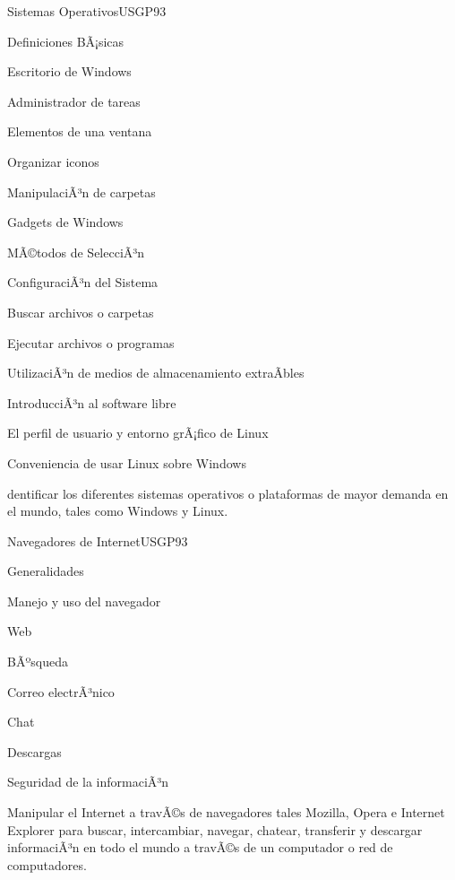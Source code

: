 \begin{syllabus}
\begin{unit}{Sistemas Operativos}{USGP}{9}{3}
\begin{topics}
      \item Definiciones BÃ¡sicas
      \item Escritorio de Windows
      \item Administrador de tareas
      \item Elementos de una ventana
      \item Organizar iconos
      \item ManipulaciÃ³n de carpetas
      \item Gadgets de Windows 
      \item MÃ©todos de SelecciÃ³n
      \item ConfiguraciÃ³n del Sistema
      \item Buscar archivos o carpetas
      \item Ejecutar archivos o programas
      \item UtilizaciÃ³n de medios de almacenamiento extraÃ­bles
      \item IntroducciÃ³n al software libre
      \item El perfil de usuario y entorno grÃ¡fico de Linux
      \item Conveniencia de usar Linux sobre Windows
\end{topics}
\begin{unitgoals}
   \item dentificar los diferentes sistemas operativos o plataformas de mayor demanda en el mundo, tales como Windows y Linux.
\end{unitgoals}
\end{unit}

\begin{unit}{Navegadores de Internet}{USGP}{9}{3}
\begin{topics}
      \item Generalidades
      \item Manejo y uso del navegador
      \item Web
      \item BÃºsqueda
      \item Correo electrÃ³nico
      \item Chat
      \item Descargas
      \item Seguridad de la informaciÃ³n
\end{topics}
\begin{unitgoals}
   \item Manipular el Internet a travÃ©s de navegadores tales Mozilla, Opera e Internet Explorer para buscar, intercambiar, navegar, chatear, transferir y descargar informaciÃ³n en todo el mundo a travÃ©s de un computador o red de computadores.
\end{unitgoals}
\end{unit}


\end{syllabus}
